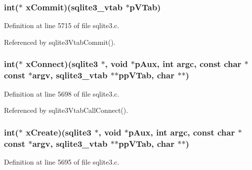 \hypertarget{structsqlite3__module_af5082ff14fbea2a1a9f076ce5cbda3ea}{}
\subsubsection[{x\+Commit}]{\setlength{\rightskip}{0pt plus 5cm}int($\ast$ x\+Commit)({\bf sqlite3\+\_\+vtab} $\ast$p\+V\+Tab)}\label{structsqlite3__module_af5082ff14fbea2a1a9f076ce5cbda3ea}


Definition at line 5715 of file sqlite3.\+c.



Referenced by sqlite3\+Vtab\+Commit().

\hypertarget{structsqlite3__module_a19f7accc13ac8ca9bdf5d3924b7eaf2b}{}
\subsubsection[{x\+Connect}]{\setlength{\rightskip}{0pt plus 5cm}int($\ast$ x\+Connect)({\bf sqlite3} $\ast$, void $\ast$p\+Aux, int argc, const char $\ast$const $\ast$argv, {\bf sqlite3\+\_\+vtab} $\ast$$\ast$pp\+V\+Tab, char $\ast$$\ast$)}\label{structsqlite3__module_a19f7accc13ac8ca9bdf5d3924b7eaf2b}


Definition at line 5698 of file sqlite3.\+c.



Referenced by sqlite3\+Vtab\+Call\+Connect().

\hypertarget{structsqlite3__module_a93a4064c04057781ac266ed5974ceb81}{}
\subsubsection[{x\+Create}]{\setlength{\rightskip}{0pt plus 5cm}int($\ast$ x\+Create)({\bf sqlite3} $\ast$, void $\ast$p\+Aux, int argc, const char $\ast$const $\ast$argv, {\bf sqlite3\+\_\+vtab} $\ast$$\ast$pp\+V\+Tab, char $\ast$$\ast$)}\label{structsqlite3__module_a93a4064c04057781ac266ed5974ceb81}


Definition at line 5695 of file sqlite3.\+c.



